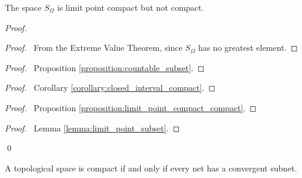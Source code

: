 \begin{example}
    The space $S_\Omega$ is limit point compact but not compact.

    \begin{proof}
        \pf
        \begin{proof}
            \pf\ From the Extreme Value Theorem, since $S_\Omega$ has no greatest element.
        \end{proof}
        \begin{proof}
            \pf\ Proposition \ref{proposition:countable_subset}.
        \end{proof}
        \begin{proof}
            \pf\ Corollary \ref{corollary:closed_interval_compact}.
        \end{proof}
        \begin{proof}
            \pf\ Proposition \ref{proposition:limit_point_compact_compact}.
        \end{proof}
        \begin{proof}
            \pf\ Lemma \ref{lemma:limit_point_subset}.
        \end{proof}
        \qed
    \end{proof}
\end{example}

\begin{proposition}[AC]
    A topological space is compact if and only if every net has a convergent subnet.
\end{proposition}

